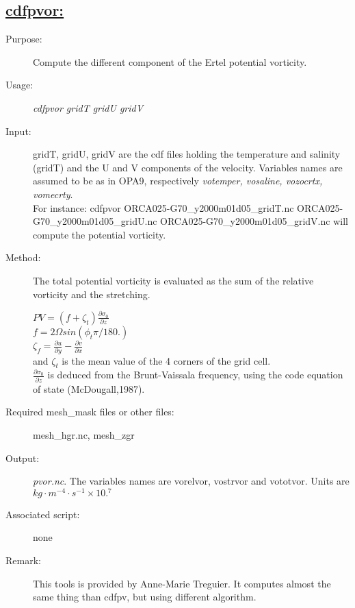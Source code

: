 \documentclass[a4paper,11pt]{article}
\begin{document}
\subsection*{\underline{cdfpvor:}}
\begin{description}
\item[Purpose:] Compute the different component of the Ertel potential vorticity.
\item[Usage:] {\em cdfpvor gridT gridU gridV }\\
\item[Input:] gridT, gridU, gridV are the cdf files holding the temperature and salinity (gridT) and the  U and V components of the velocity. Variables names are assumed to
be as in OPA9, respectively {\em votemper, vosaline, vozocrtx, vomecrty}.\\
For instance: cdfpvor ORCA025-G70\_y2000m01d05\_gridT.nc ORCA025-G70\_y2000m01d05\_gridU.nc ORCA025-G70\_y2000m01d05\_gridV.nc
will compute  the potential vorticity. \\
\item[Method:] The total potential vorticity is evaluated as the sum of the relative vorticity and the stretching.

$   PV = (f+\zeta_t)\frac{\partial\sigma_0}{\partial z} $ \\

$   f  = 2 \Omega sin ( \phi_t  \pi / 180. ) $ \\

$   \zeta_f= \frac{\partial u}{\partial y} -  \frac{\partial v}{\partial x}  $ \\

   and $\zeta_t$ is the mean value of the 4 corners of the grid cell. \\
$ \frac{\partial\sigma_0}{\partial z} $ is deduced from the Brunt-Vaissala frequency, using the code equation of state (McDougall,1987).


\item[Required mesh\_mask files or other files:] mesh\_hgr.nc, mesh\_zgr
\item[Output:] {\em pvor.nc}. The variables names are vorelvor, vostrvor and vototvor. Units are $kg\cdot m^{-4}\cdot s^{-1}\times10.^{7}$
\item[Associated script:] none
\item[Remark:] This tools is provided by Anne-Marie Treguier. It computes almost the same thing than cdfpv, but using different algorithm.
\end{description}
\end{document}
